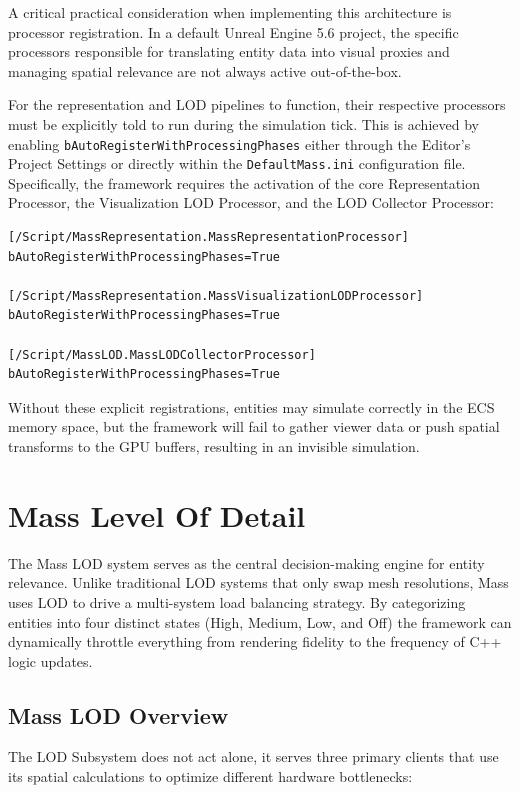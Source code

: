 A critical practical consideration when implementing this architecture is processor registration. In a default Unreal Engine 5.6 project, the specific processors responsible for translating entity data into visual proxies and managing spatial relevance are not always active out-of-the-box.\cite{60MinutesWithMass}

For the representation and LOD pipelines to function, their respective processors must be explicitly told to run during the simulation tick. This is achieved by enabling \texttt{bAutoRegisterWithProcessingPhases} either through the Editor's Project Settings or directly within the \texttt{DefaultMass.ini} configuration file. Specifically, the framework requires the activation of the core Representation Processor, the Visualization LOD Processor, and the LOD Collector Processor:
\begin{lstlisting}
[/Script/MassRepresentation.MassRepresentationProcessor]
bAutoRegisterWithProcessingPhases=True

[/Script/MassRepresentation.MassVisualizationLODProcessor]
bAutoRegisterWithProcessingPhases=True

[/Script/MassLOD.MassLODCollectorProcessor]
bAutoRegisterWithProcessingPhases=True
\end{lstlisting}

Without these explicit registrations, entities may simulate correctly in the ECS memory space, but the framework will fail to gather viewer data or push spatial transforms to the GPU buffers, resulting in an invisible simulation.

\section[Mass Level Of Detail]{Mass Level Of Detail}

The Mass LOD system serves as the central decision-making engine for entity relevance. Unlike traditional LOD systems that only swap mesh resolutions, Mass uses LOD to drive a multi-system load balancing strategy. By categorizing entities into four distinct states (High, Medium, Low, and Off) the framework can dynamically throttle everything from rendering fidelity to the frequency of C++ logic updates.

\subsection{Mass LOD Overview}

The LOD Subsystem does not act alone, it serves three primary clients that use its spatial calculations to optimize different hardware bottlenecks:

